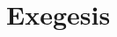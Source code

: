 \documentclass[11pt,letterpaper,oneside]{amsart}
\newcommand{\e}{\emph}
\newcommand{\kum}{Kum\={a}rila}
\newcommand{\svapra}{\e{svata\d{h} pr\={a}m\={a}\d{n}ya}}
\begin{document}












\section{Exegesis} \label{textualinterpretation} %


\end{document}
